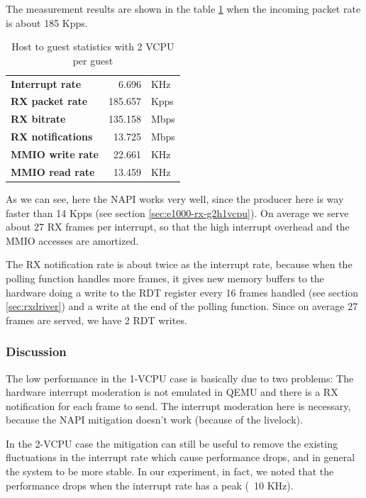 The measurement results are shown in the table \ref{tab:e1000-rx-g2h2vcpu} when the incoming packet rate is about 185 Kpps.

\begin{table}
\begin{center}
\begin{tabular}{lrl}
\toprule
\textbf{Interrupt rate} & 6.696 & KHz\\
\textbf{RX packet rate} & 185.657 & Kpps\\
\textbf{RX bitrate} & 135.158 & Mbps\\
\textbf{RX notifications} & 13.725 & Mbps\\
\textbf{MMIO write rate} & 22.661 & KHz\\
\textbf{MMIO read rate} & 13.459 & KHz\\
\bottomrule
\end{tabular}
\end{center}
\caption[H2G with 2VCPU per guest]{Host to guest statistics with 2 VCPU per guest}
\label{tab:e1000-rx-g2h2vcpu}
\end{table}

As we can see, here the NAPI works very well, since the producer here is way faster than 14 Kpps (see section \ref{sec:e1000-rx-g2h1vcpu}).
On average we serve about 27 RX frames per interrupt, so that the high interrupt overhead and the MMIO accesses are amortized.

The RX notification rate is about twice as the interrupt rate, because when the polling function handles more frames, it gives new memory
buffers to the hardware doing a write to the RDT register every 16 frames handled (see section \ref{sec:rxdriver}) and a write at the end
of the polling function. Since on average 27 frames are served, we have 2 RDT writes.


\subsubsection{Discussion}
The low performance in the 1-VCPU case is basically due to two problems: The hardware interrupt moderation is not emulated in QEMU and
there is a RX notification for each frame to send. The interrupt moderation here is necessary, because the NAPI mitigation doesn't work
(because of the livelock).

In the 2-VCPU case the mitigation can still be useful to remove the existing fluctuations in the interrupt rate which cause performance
drops, and in general the system to be more stable. In our experiment, in fact, we noted that the performance drops when the interrupt
rate has a peak (~10 KHz).

